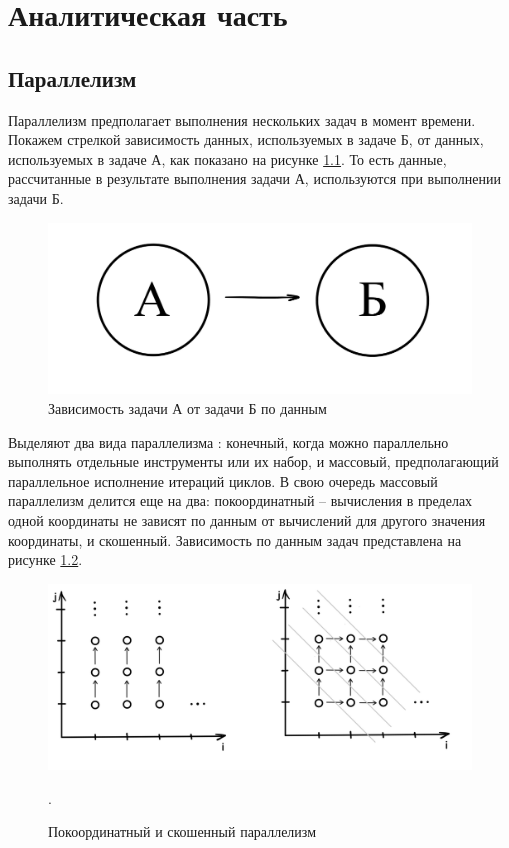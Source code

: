\chapter{Аналитическая часть}

\section{Параллелизм}
Параллелизм предполагает выполнения нескольких задач в момент времени. 
Покажем стрелкой зависимость данных, используемых в задаче Б, от данных, используемых в задаче А, как показано на рисунке \ref{fig:picture1.1}.
То есть данные, рассчитанные в результате выполнения задачи А, используются при выполнении задачи Б. 

\begin{figure}[h!]
	\centering
	\includegraphics[scale=0.4]{img/Связь.png}
	\caption{Зависимость задачи А от задачи Б по данным}
	\label{fig:picture1.1}
\end{figure}

Выделяют два вида параллелизма \cite{paralleltype}: конечный, когда можно параллельно выполнять отдельные инструменты или их набор, и массовый, предполагающий параллельное исполнение итераций циклов. 
В свою очередь массовый параллелизм делится еще на два: покоординатный -- вычисления в пределах одной координаты не зависят по данным от вычислений для другого значения координаты, и скошенный. 
Зависимость по данным задач представлена на рисунке \ref{fig:picture1.2}.

\begin{figure}[h!]
	\centering
	\includegraphics[scale=0.9]{img/Параллелизм.png}
	\caption{Покоординатный и скошенный параллелизм}
	\label{fig:picture1.2}.
\end{figure}

